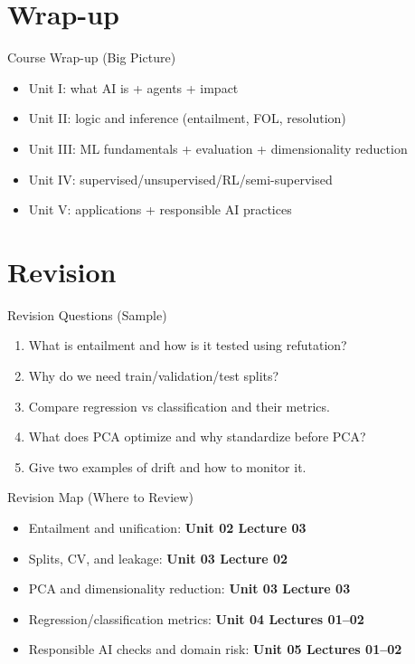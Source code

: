 \documentclass[aspectratio=169]{beamer}
\begin{document}
\section{Wrap-up}
\label{sec:wrap}

\begin{frame}{Course Wrap-up (Big Picture)}
  \begin{itemize}[<+->]
    \item Unit I: what AI is + agents + impact
    \item Unit II: logic and inference (entailment, FOL, resolution)
    \item Unit III: ML fundamentals + evaluation + dimensionality reduction
    \item Unit IV: supervised/unsupervised/RL/semi-supervised
    \item Unit V: applications + responsible AI practices
  \end{itemize}
\end{frame}

\section{Revision}
\label{sec:rev}

\begin{frame}{Revision Questions (Sample)}
  \begin{enumerate}
    \item What is entailment and how is it tested using refutation?
    \item Why do we need train/validation/test splits?
    \item Compare regression vs classification and their metrics.
    \item What does PCA optimize and why standardize before PCA?
    \item Give two examples of drift and how to monitor it.
  \end{enumerate}
\end{frame}

\begin{frame}{Revision Map (Where to Review)}
  \begin{itemize}[<+->]
    \item Entailment and unification: \textbf{Unit 02 Lecture 03}
    \item Splits, CV, and leakage: \textbf{Unit 03 Lecture 02}
    \item PCA and dimensionality reduction: \textbf{Unit 03 Lecture 03}
    \item Regression/classification metrics: \textbf{Unit 04 Lectures 01--02}
    \item Responsible AI checks and domain risk: \textbf{Unit 05 Lectures 01--02}
  \end{itemize}
\end{frame}
\end{document}
